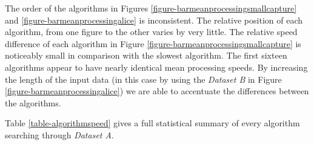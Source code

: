 \documentclass[9pt, technote]{IEEEtran}
\begin{document}
The order of the algorithms in Figures \ref{figure-barmeanprocessingsmallcapture} and \ref{figure-barmeanprocessingalice} is inconsistent. The relative position of each algorithm, from one figure to the other varies by very little. The relative speed difference of each algorithm in Figure \ref{figure-barmeanprocessingsmallcapture} is noticeably small in comparison with the slowest algorithm. The first sixteen algorithms appear to have nearly identical mean processing speeds. By increasing the length of the input data (in this case by using the \textit{Dataset B} in Figure \ref{figure-barmeanprocessingalice}) we are able to accentuate the differences between the algorithms.

Table \ref{table-algorithmspeed} gives a full statistical summary of every algorithm searching through \textit{Dataset A}.\\
\end{document}

